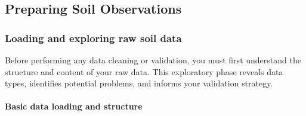 \documentclass[
  10pt,
  b5paper,
  oneside]{book}
\begin{document}
\subsection{Preparing Soil Observations}\label{preparing-soil-observations}

\subsubsection{Loading and exploring raw soil data}\label{loading-and-exploring-raw-soil-data}

Before performing any data cleaning or validation, you must first understand the structure and content of your raw data. This exploratory phase reveals data types, identifies potential problems, and informs your validation strategy.

\paragraph*{Basic data loading and structure}\label{basic-data-loading-and-structure}
\end{document}

